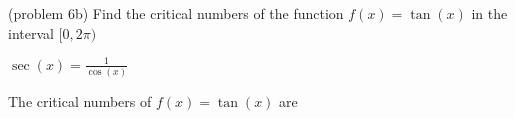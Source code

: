 \documentclass{ximera}
\begin{document}
\begin{problem}(problem 6b)
  Find the critical numbers of the function $f(x) = \tan(x)$ in the interval $[0, 2\pi)$
  
		\begin{hint}
      $\sec(x) = \frac{1}{\cos(x)}$
    \end{hint}
      
		The critical numbers of $f(x) = \tan(x)$ are
		 \begin{multipleChoice}
		\end{multipleChoice} 
\end{problem}



\begin{center}
\begin{foldable}
\end{foldable}
\end{center}
\end{document}
